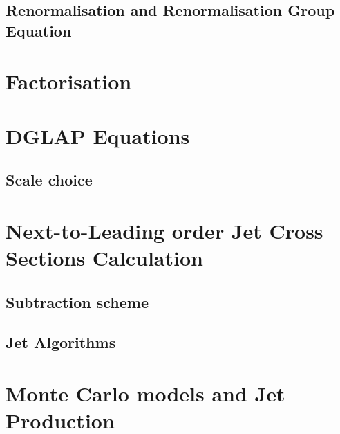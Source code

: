 \subsection{Renormalisation and Renormalisation Group Equation}


\section{Factorisation}


\section{DGLAP Equations}


\subsection{Scale choice}


\section{Next-to-Leading order Jet Cross Sections Calculation}


\subsection{Subtraction scheme}
\label{subsec:subscheme}

 
\subsection{Jet Algorithms}
\label{subsec:jetalgo}

%

\section{Monte Carlo models and Jet Production}
